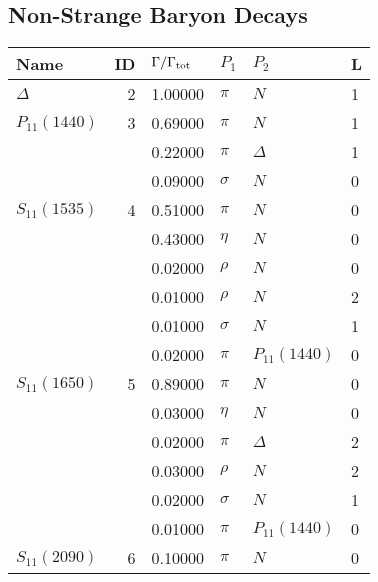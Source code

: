 \documentclass[a4paper,10pt]{article}
\begin{document}
\subsection{Non-Strange Baryon Decays}
\begin{tabular}[t]{|lr|l|ll|l|} 
\hline
Name & ID & $\Gamma/\Gamma_{\rm tot}$ & $P_1$ & $P_2$ & L \\ 
\hline
$      \Delta        $&  2& 1.00000&$ \pi                 $ &$ N                   $& 1\\
\hline
$      P_{11}(1440)  $&  3& 0.69000&$ \pi                 $ &$ N                   $& 1\\
$                    $&   & 0.22000&$ \pi                 $ &$ \Delta              $& 1\\
$                    $&   & 0.09000&$ \sigma              $ &$ N                   $& 0\\
\hline
$      S_{11}(1535)  $&  4& 0.51000&$ \pi                 $ &$ N                   $& 0\\
$                    $&   & 0.43000&$ \eta                $ &$ N                   $& 0\\
$                    $&   & 0.02000&$ \rho                $ &$ N                   $& 0\\
$                    $&   & 0.01000&$ \rho                $ &$ N                   $& 2\\
$                    $&   & 0.01000&$ \sigma              $ &$ N                   $& 1\\
$                    $&   & 0.02000&$ \pi                 $ &$ P_{11}(1440)        $& 0\\
\hline
$      S_{11}(1650)  $&  5& 0.89000&$ \pi                 $ &$ N                   $& 0\\
$                    $&   & 0.03000&$ \eta                $ &$ N                   $& 0\\
$                    $&   & 0.02000&$ \pi                 $ &$ \Delta              $& 2\\
$                    $&   & 0.03000&$ \rho                $ &$ N                   $& 2\\
$                    $&   & 0.02000&$ \sigma              $ &$ N                   $& 1\\
$                    $&   & 0.01000&$ \pi                 $ &$ P_{11}(1440)        $& 0\\
\hline
$      S_{11}(2090)  $&  6& 0.10000&$ \pi                 $ &$ N                   $& 0\\

\end{tabular}
\end{document}
